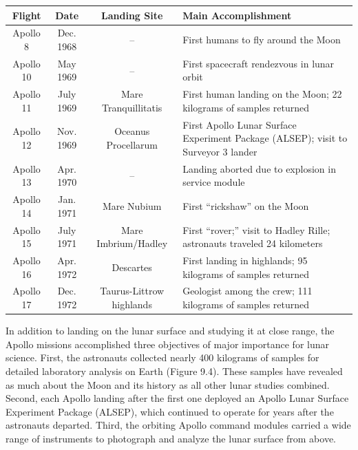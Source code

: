 \documentclass{article}
\numberwithin{equation}{section}
\numberwithin{figure}{section}
\begin{document}
\begin{tabular}{|c|c|c|m{7.7cm}|}
    \hline
    \textbf{Flight} & \textbf{Date} & \textbf{Landing Site} & \textbf{Main Accomplishment} \\
    \hline
    Apollo 8 & Dec. 1968 & -- & First humans to fly around the Moon \\
    \hline
    Apollo 10 & May 1969 & -- & First spacecraft rendezvous in lunar orbit\\
    \hline
    Apollo 11 & July 1969 & Mare Tranquillitatis & First human landing on the Moon; 22 kilograms of samples returned\\
    \hline
    Apollo 12 & Nov. 1969 & Oceanus Procellarum	& First Apollo Lunar Surface Experiment Package (ALSEP); visit to Surveyor 3 lander\\
    \hline
    Apollo 13 & Apr. 1970 &	-- & Landing aborted due to explosion in service module\\
    \hline
    Apollo 14 & Jan. 1971 & Mare Nubium	& First ``rickshaw'' on the Moon\\
    \hline
    Apollo 15 & July 1971 & Mare Imbrium/Hadley & First ``rover;'' visit to Hadley Rille; astronauts traveled 24 kilometers\\
    \hline
    Apollo 16 & Apr. 1972 & Descartes & First landing in highlands; 95 kilograms of samples returned\\
    \hline
    Apollo 17 & Dec. 1972 & Taurus-Littrow highlands & Geologist among the crew; 111 kilograms of samples returned\\
    \hline
\end{tabular}

\vspace{1em}

In addition to landing on the lunar surface and studying it at close range, the Apollo missions accomplished three objectives of major importance for lunar science. First, the astronauts collected nearly 400 kilograms of samples for detailed laboratory analysis on Earth (Figure 9.4). These samples have revealed as much about the Moon and its history as all other lunar studies combined. Second, each Apollo landing after the first one deployed an Apollo Lunar Surface Experiment Package (ALSEP), which continued to operate for years after the astronauts departed. Third, the orbiting Apollo command modules carried a wide range of instruments to photograph and analyze the lunar surface from above.

\vspace{1em}
\end{document}
